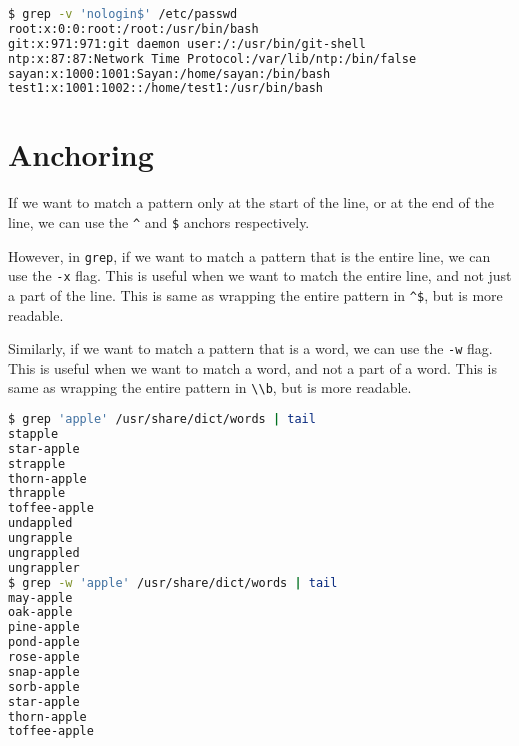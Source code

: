 \begin{lstlisting}[language=bash]
$ grep -v 'nologin$' /etc/passwd
root:x:0:0:root:/root:/usr/bin/bash
git:x:971:971:git daemon user:/:/usr/bin/git-shell
ntp:x:87:87:Network Time Protocol:/var/lib/ntp:/bin/false
sayan:x:1000:1001:Sayan:/home/sayan:/bin/bash
test1:x:1001:1002::/home/test1:/usr/bin/bash
\end{lstlisting}

\section{Anchoring}

If we want to match a pattern only at the start of the line, or at the end of the line, we can use the \lstinline|^| and \lstinline|$| anchors respectively.

However, in \lstinline|grep|, if we want to match a pattern that is the entire line, we can use the \lstinline|-x| flag. This is useful when we want to match the entire line, and not just a part of the line.
This is same as wrapping the entire pattern in \lstinline|^$|, but is more readable.

Similarly, if we want to match a pattern that is a word, we can use the \lstinline|-w| flag. This is useful when we want to match a word, and not a part of a word.
This is same as wrapping the entire pattern in \lstinline|\\b|, but is more readable.

\begin{lstlisting}[language=bash]
$ grep 'apple' /usr/share/dict/words | tail
stapple
star-apple
strapple
thorn-apple
thrapple
toffee-apple
undappled
ungrapple
ungrappled
ungrappler
$ grep -w 'apple' /usr/share/dict/words | tail
may-apple
oak-apple
pine-apple
pond-apple
rose-apple
snap-apple
sorb-apple
star-apple
thorn-apple
toffee-apple
\end{lstlisting}

